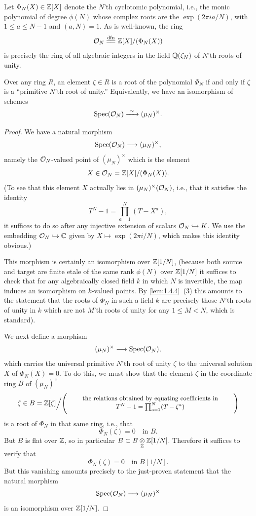 \kmitem\label{km:1.12.8}
Let $\Phi_N(X) \in \mathbb{Z}[X]$ denote the $N$'th cyclotomic polynomial, i.e., the monic polynomial of degree $\phi(N)$ whose complex roots are the $\exp(2\pi i a/N)$, with $1 \le a \le N-1$ and $(a, N) = 1$. As is well-known, the ring
\[
\cO_N \xlongequal{dfn} \Z[X]/(\Phi_N(X))
\]
is precisely the ring of all algebraic integers in the field $\mathbb{Q}(\zeta_N)$ of $N$'th roots of unity.

\begin{theorem}\label{thm:1.12.9}
Over any ring $R$, an element $\zeta \in R$ is a root of the polynomial $\Phi_N$ if and only if $\zeta$ is a ``primitive $N$'th root of unity.'' Equivalently, we have an isomorphism of schemes
\[
\operatorname{Spec}(\mathcal{O}_N) \xrightarrow{\ \sim\ } (\mu_N)^\times.
\]
\end{theorem}

\begin{proof}
We have a natural morphism
\[
\operatorname{Spec}(\mathcal{O}_N) \longrightarrow (\mu_N)^\times,
\]
namely the $\mathcal{O}_N$-valued point of $(\mu_N)^\times$ which is the element
\[
X \in \mathcal{O}_N = \mathbb{Z}[X]/(\Phi_N(X)).
\]
(To see that this element $X$ actually lies in $(\mu_N)^\times(\mathcal{O}_N)$, i.e., that it satisfies the identity
\[
T^N - 1 = \prod_{a=1}^N (T - X^a),
\]
it suffices to do so after any injective extension of scalars $\mathcal{O}_N \hookrightarrow K$. We use the embedding $\mathcal{O}_N \hookrightarrow \mathbb{C}$ given by $X \mapsto \exp(2\pi i/N)$, which makes this identity obvious.)

This morphism is certainly an isomorphism over $\mathbb{Z}[1/N]$, (because both source and target are finite etale of the same rank $\phi(N)$ over $\mathbb{Z}[1/N]$ it suffices to check that for any algebraically closed field $k$ in which $N$ is invertible, the map induces an isomorphism on $k$-valued points. By \ref{lem:1.4.4}~(3) this amounts to the statement that the roots of $\Phi_N$ in such a field $k$ are precisely those $N$'th roots of unity in $k$ which are not $M$'th roots of unity for any $1 \le M < N$, which is standard).

We next define a morphism
\[
(\mu_N)^\times \longrightarrow \operatorname{Spec}(\mathcal{O}_N),
\]
which carries the universal primitive $N$'th root of unity $\zeta$ to the universal solution $X$ of $\Phi_N(X) = 0$. To do this, we must show that the element $\zeta$ in the coordinate ring $B$ of $(\mu_N)^\times$
\[
\small \zeta \in B = \Z[\zeta] \Big/ \Biggl( \parbox{0.70\linewidth}{\centering the relations obtained by equating coefficients in\\[1pt] $T^N - 1 = \prod_{a=1}^N (T - \zeta^a)$} \Biggr)
\]
is a root of $\Phi_N$ in that same ring, i.e., that
\[
\Phi_N(\zeta) = 0 \quad \text{in } B.
\]
But $B$ is flat over $\mathbb{Z}$, so in particular $B \subset B \underset{\mathbb{Z}}{\otimes} \mathbb{Z}[1/N]$. Therefore it suffices to verify that
\[
\Phi_N(\zeta) = 0 \quad \text{in } B[1/N].
\]
But this vanishing amounts precisely to the just-proven statement that the natural morphism
\[
\operatorname{Spec}(\mathcal{O}_N) \longrightarrow (\mu_N)^\times
\]
is an isomorphism over $\mathbb{Z}[1/N]$.


\end{proof}
